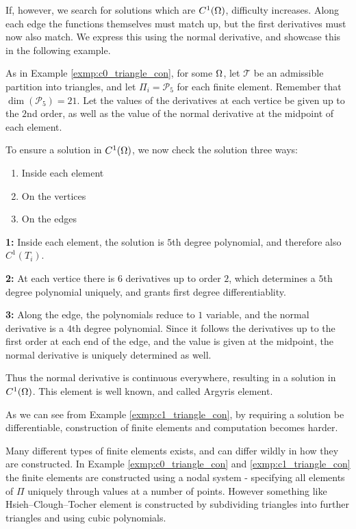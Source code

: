 If, however, we search for solutions which 
are $C^1(\Omega)$, difficulty increases. Along each edge the functions 
themselves must match up, but the first derivatives must now also match. 
We express this using the normal derivative, and showcase this in the 
following example. 
\begin{exmp}{\quad\label{exmp:c1_triangle_con}}
   As in Example \ref{exmp:c0_triangle_con}, 
    for some $\Omega$, let $\mathcal{T}$ be an admissible partition into 
    triangles, and let $\Pi_i = \mathcal{P}_5$ for each finite element.
    Remember that $\dim(\mathcal{P}_5) = 21$.
    Let the values of the derivatives at each vertice be given up 
    to the $2$nd order, as well as the value of the normal derivative at the 
    midpoint of each element.
    
    To ensure a solution in $C^1(\Omega)$, 
    we now check the solution three ways:
    \begin{enumerate}
        \item Inside each element
        \item On the vertices
        \item On the edges
    \end{enumerate} 
    \textbf{1:} Inside each element, the solution is $5$th degree polynomial, 
    and therefore also $C^1(T_i)$.

    \textbf{2:} At each vertice there is $6$ derivatives up to order $2$, which 
    determines a $5$th degree polynomial uniquely, and grants first 
    degree differentiablity.

    \textbf{3:} Along the edge, the polynomials reduce to $1$ variable, and the 
    normal derivative is a $4$th degree polynomial. Since it follows 
    the derivatives up to the first order at each end of the edge, and 
    the value is given at the midpoint, the normal derivative is uniquely 
    determined as well.

    Thus the normal derivative is continuous everywhere, resulting in a 
    solution in $C^1(\Omega)$. This element is well known, and called 
    Argyris element.
\end{exmp}
As we can see from Example \ref{exmp:c1_triangle_con}, by requiring a 
solution be differentiable, construction of finite elements and computation 
becomes harder. 

Many different types of finite elements exists, and can differ wildly in how they 
are constructed. In Example \ref{exmp:c0_triangle_con} and \ref{exmp:c1_triangle_con} 
the finite elements are constructed using a nodal system - specifying all elements of $\Pi$ 
uniquely through values at a number of points. However something like Hsieh–Clough–Tocher element 
is constructed by subdividing triangles into further triangles and using 
cubic polynomials.

